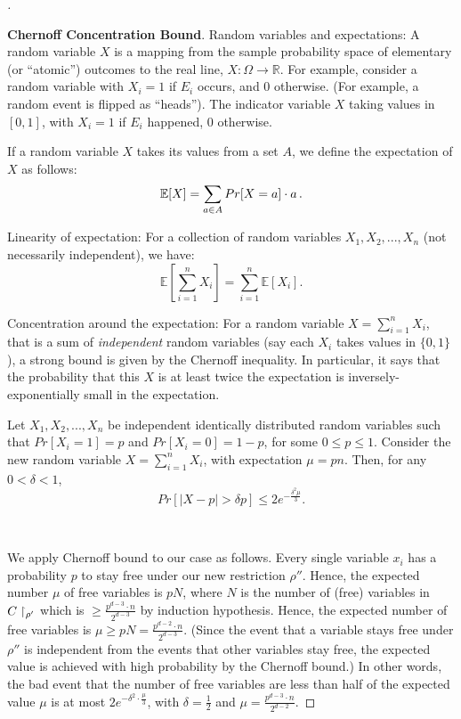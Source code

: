 \begin{proof}[]
\begin{tcolorbox}[colframe=white, colback=gray!11, boxrule=0mm, sharp corners]
\textbf{Chernoff Concentration Bound}.
Random variables and expectations: A random variable \( X \) is a mapping from the sample probability space of elementary (or ``atomic'') outcomes to the real line, \( X: \Omega \to \mathbb{R} \). For example, consider a random variable with \( X_i = 1 \) if \( E_i \) occurs, and \( 0 \) otherwise. (For example, a random event is flipped as ``heads''). The indicator variable \( X \) taking values in \( [0, 1] \), with \( X_i = 1 \) if \( E_i \) happened, \( 0 \) otherwise.

If a random variable \( X \) takes its values from a set \( A \), we define the expectation of \( X \) as follows:
\[
\mathbb{E}[X] = \sum_{a\in A} Pr[X = a]\cdot a\,.
\]

Linearity of expectation: For a collection of random variables \( X_1, X_2, ..., X_n \) (not necessarily independent), we have:
\[
\mathbb{E} \left[ \sum_{i=1}^{n} X_i \right] = \sum_{i=1}^{n} \mathbb{E}[X_i].
\]

Concentration around the expectation: 
For a random variable \( X = \sum^n_{i=1} X_i \), that is a sum of \emph{independent} random variables (say each \( X_i \) takes values in \( \{0, 1\} \)), a  strong bound is given by the Chernoff inequality. In particular, it says that the probability that this \( X \) is at least twice the expectation is inversely-exponentially small in the expectation.

\begin{theorem} Let \( X_1, X_2, ..., X_n \) be independent identically distributed random variables such that \( Pr[X_i = 1] = p \) and \( Pr[X_i = 0] = 1 - p \), for some \( 0 \leq p \leq 1 \).
Consider the new random variable \( X = \sum_{i=1}^n X_i \), with expectation \( \mu = pn \). Then, for any \( 0 < \delta < 1 \),
\[
Pr[|X - p| > \delta p] \leq 2 e^{- \frac{\delta^2 \mu}{3}}.
\]
\end{theorem}
\end{tcolorbox}



\
\

We apply Chernoff bound to our case as follows.
Every single variable \( x_i \) has a probability \( p \) to stay free under our new restriction  \( \rho'' \).
Hence, the expected number $\mu$ of free variables is \( pN \), where $N$ is the number of (free) variables in $C\upharpoonright_{\rho'}$ which is $\ge \frac{p^{d-3} \cdot n}{2^{d-3}}$ by induction hypothesis. Hence, the expected number of free variables is $\mu\ge pN= \frac{p^{d-2} \cdot n}{2^{d-3}}$. 
(Since the event that a variable stays free under \( \rho'' \) is independent from the events that other variables stay free, the expected value is achieved with high probability by the Chernoff bound.)
 In other words, the bad event that the number of free variables are less than half of the expected value $\mu$ is at most $
2e^{-\delta^2 \cdot \frac{\mu}{3}}$, with $\delta = \frac{1}{2}$ and  $\mu = \frac{p^{d-3} \cdot n}{2^{d-2}}.$


\end{proof}
